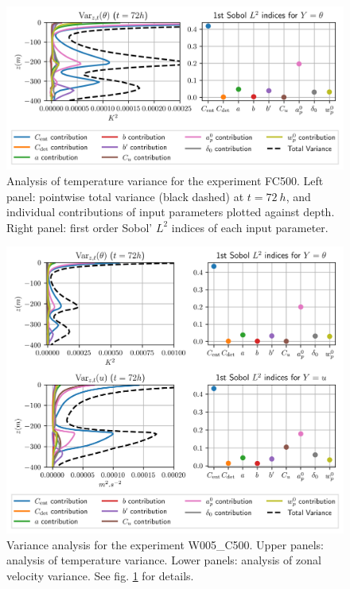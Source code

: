 \documentclass[draft]{agujournal2019}
\begin{document}
\begin{figure}
    \includegraphics[width=\textwidth]{figures/analysis_of_variance_FC5002048.png}
    \caption{Analysis of temperature variance for the experiment FC500. Left panel: pointwise total variance (black dashed) at $t=\SI{72}{h}$, and individual contributions of input parameters plotted against depth. Right panel: first order Sobol' $L^2$ indices of each input parameter.}
    \label{fig: sobol FC500}
\end{figure}
%
\begin{figure}
    \includegraphics[width=\textwidth]{figures/analysis_of_variance_W005_C500_NO_COR2048.png}
    \caption{Variance analysis for the experiment W005\_C500. Upper panels: analysis of temperature variance. Lower panels: analysis of zonal velocity variance. See fig. \ref{fig: sobol FC500} for details.}
    \label{fig: sobol W005_C500}
\end{figure}
\end{document}
